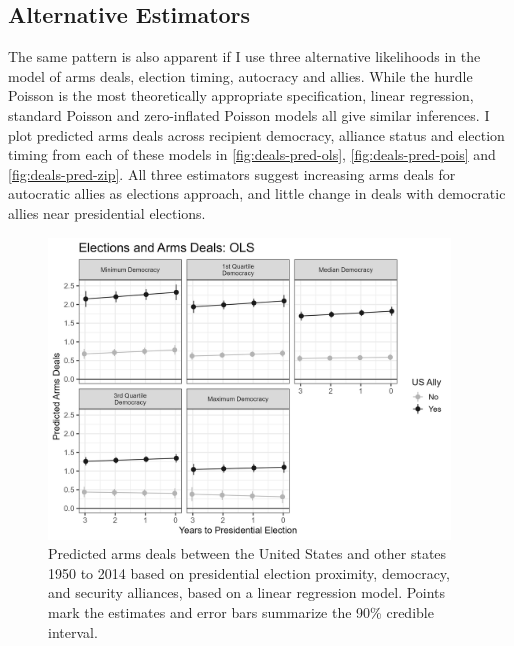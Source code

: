 \documentclass[12pt]{article}
\begin{document}
\subsection{Alternative Estimators}


The same pattern is also apparent if I use three alternative likelihoods in the model of arms deals, election timing, autocracy and allies. 
While the hurdle Poisson is the most theoretically appropriate specification, linear regression, standard Poisson and zero-inflated Poisson models all give similar inferences.
I plot predicted arms deals across recipient democracy, alliance status and election timing from each of these models in \autoref{fig:deals-pred-ols},  \autoref{fig:deals-pred-pois} and \autoref{fig:deals-pred-zip}. 
All three estimators suggest increasing arms deals for autocratic allies as elections approach, and little change in deals with democratic allies near presidential elections. 


\begin{figure}[htpb]
	\centering
		\includegraphics[width=0.95\textwidth]{deals-pred-ols.png}
	\caption{Predicted arms deals between the United States and other states 1950 to 2014 based on presidential election proximity, democracy, and security alliances, based on a linear regression model. Points mark the estimates and error bars summarize the 90\% credible interval.}
	\label{fig:deals-pred-ols}
\end{figure}
\end{document}
